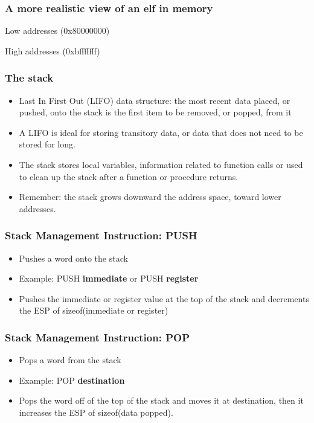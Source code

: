 \documentclass[]{beamer}
\begin{document}
\begin{frame}
  \frametitle{A more realistic view of an elf in memory}
  \begin{center}
    {\tiny Low addresses (0x80000000)}
    \begin{center}
    \end{center}
    {\tiny High addresses (0xbfffffff)}
  \end{center}
\end{frame}

\begin{frame}
  \frametitle{The stack}
  \begin{itemize}
  \item{Last In First Out (LIFO) data structure: the most recent data placed, or pushed, onto the stack is the first item to be removed, or popped, from it}
  \item{A LIFO is ideal for storing transitory data, or data that does not need to be stored for long.}
  \item{The stack stores local variables, information related to function calls or used to clean up the stack after a function or procedure returns.}
  \item{Remember: the stack grows downward the address space, toward lower addresses.}
  \end{itemize}
\end{frame}
\begin{frame}
  \frametitle{Stack Management Instruction: PUSH}
  \begin{itemize}
  \item{Pushes a word onto the stack}
  \item{Example: PUSH {\bf immediate} or PUSH {\bf register} }
  \item{Pushes the immediate or register value at the top of the stack and decrements the ESP of sizeof(immediate or register)}
  \end{itemize}
\end{frame}
\begin{frame}
  \frametitle{Stack Management Instruction: POP}
  \begin{itemize}
  \item{Pops a word from the stack}
  \item{Example: POP {\bf destination} }
  \item{Pops the word off of the top of the stack and moves it at destination, then it increases the ESP of sizeof(data popped).}
  \end{itemize}
\end{frame}
\end{document}
